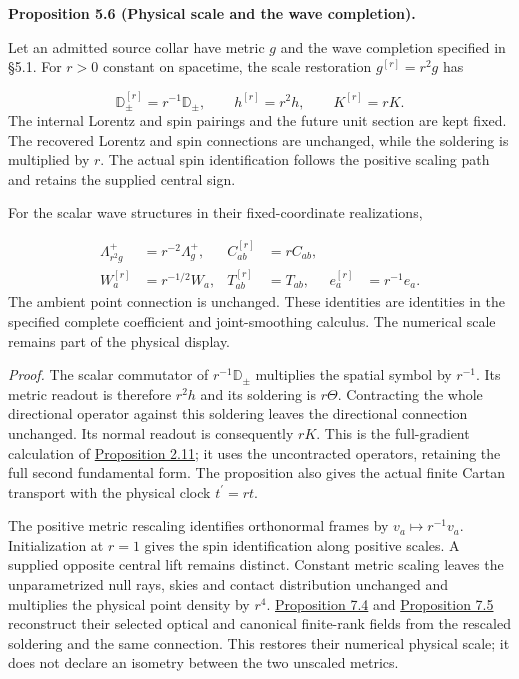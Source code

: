 \documentclass[
  english,
  11pt,
  reqno]{amsart}
\makeatletter
\newcommand{\pandocstatementheading}[1]{%
  \par\addpenalty{\@beginparpenalty}%
  \addvspace{.5\baselineskip plus .2\baselineskip minus .2\baselineskip}%
  {\normalfont\bfseries #1\par}%
  \nobreak\@afterindenttrue\@afterheading
}
\makeatother
\begin{document}
\pandocstatementheading{\leavevmode{}\label{prop:submission-complete-source-physical-scale}Proposition 5.6 (Physical scale and the wave completion).}

Let an admitted source collar have metric \(g\) and the wave completion
specified in §5.1. For \(r>0\) constant on spacetime, the scale
restoration \(g^{[r]}=r^2g\) has

\label{eq:submission-gradient-physical-scale} \[
\mathbb D_\pm^{[r]}=r^{-1}\mathbb D_\pm,\qquad
h^{[r]}=r^2h,\qquad K^{[r]}=rK.
\] The internal Lorentz and spin pairings and the future unit section
are kept fixed. The recovered Lorentz and spin connections are
unchanged, while the soldering is multiplied by \(r\). The actual spin
identification follows the positive scaling path and retains the
supplied central sign.

For the scalar wave structures in their fixed-coordinate realizations,

\label{eq:submission-wave-physical-scale} \[
\begin{aligned}
\Lambda_{r^2g}^+&=r^{-2}\Lambda_g^+,
&
C_{ab}^{[r]}&=rC_{ab},\\
W_a^{[r]}&=r^{-1/2}W_a,
&
T_{ab}^{[r]}&=T_{ab},
&
e_a^{[r]}&=r^{-1}e_a.
\end{aligned}
\] The ambient point connection is unchanged. These identities are
identities in the specified complete coefficient and joint-smoothing
calculus. The numerical scale remains part of the physical display.

\emph{Proof.} The scalar commutator of \(r^{-1}\mathbb D_\pm\)
multiplies the spatial symbol by \(r^{-1}\). Its metric readout is
therefore \(r^2h\) and its soldering is \(r\Theta\). Contracting the
whole directional operator against this soldering leaves the directional
connection unchanged. Its normal readout is consequently \(rK\). This is
the full-gradient calculation of
\hyperref[prop:online-cartan-physical-scale]{Proposition 2.11}; it uses
the uncontracted operators, retaining the full second fundamental form.
The proposition also gives the actual finite Cartan transport with the
physical clock \(t^{\prime}=rt\).

The positive metric rescaling identifies orthonormal frames by
\(v_a\mapsto r^{-1}v_a\). Initialization at \(r=1\) gives the spin
identification along positive scales. A supplied opposite central lift
remains distinct. Constant metric scaling leaves the unparametrized null
rays, skies and contact distribution unchanged and multiplies the
physical point density by \(r^4\).
\hyperref[prop:online-canonical-optical-completion]{Proposition 7.4} and
\hyperref[prop:online-canonical-finite-rank-models]{Proposition 7.5}
reconstruct their selected optical and canonical finite-rank fields from
the rescaled soldering and the same connection. This restores their
numerical physical scale; it does not declare an isometry between the
two unscaled metrics.
\end{document}
